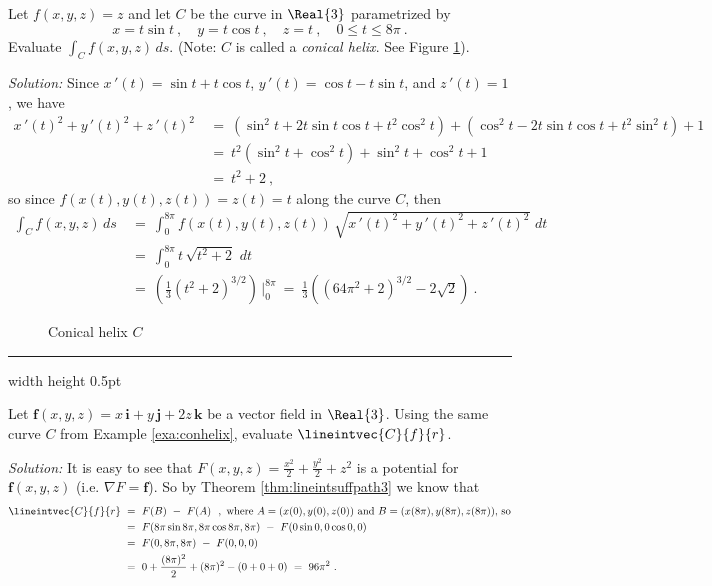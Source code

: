 \begin{exa}\label{exa:conhelix}
 Let $f(x,y,z) = z$ and let $C$ be the curve in $\Real{3}$ parametrized by
 \begin{displaymath}
  x=t\sin t ~,\quad y=t\cos t ~,\quad z=t ~,\quad 0\le t \le 8\pi ~.
 \end{displaymath}
 Evaluate $\int_C f(x,y,z)\,ds$. (Note:
 $C$ is called a \emph{conical helix}. See Figure \ref{fig:conhelix}).\vspace{1.5mm}
 \par\noindent \emph{Solution:} Since $x\,'(t)=\sin t + t\cos t$, $y\,'(t)=\cos t - t\sin t$, and $z\,'(t)=1$, we have
 \begin{align*}
  x\,'(t)^2 + y\,'(t)^2 + z\,'(t)^2 ~&=~ (\sin^2 t + 2t\sin t \cos t + t^2 \cos^2 t) + (\cos^2 t - 2t\sin t \cos t +
   t^2 \sin^2 t) + 1\\
   &=~ t^2 (\sin^2 t + \cos^2 t) + \sin^2 t + \cos^2 t + 1\\
   &=~ t^2 + 2 ~,
 \end{align*}
 so since $f(x(t),y(t),z(t)) = z(t) = t$ along the curve $C$, then
 \begin{align*}
  \int_C f(x,y,z)\,ds ~&=~ \int_0^{8\pi} f(x(t),y(t),z(t)) \,\sqrt{x\,'(t)^2 + y\,'(t)^2 + z\,'(t)^2}\,\,dt\\
   &=~ \int_0^{8\pi} t\,\sqrt{t^2 + 2}\,\,dt\\
   &=~ \left( \frac{1}{3} (t^2 + 2)^{3/2} \right) \,\Bigg|_0^{8\pi}
   ~=~ \frac{1}{3} \left( (64\pi^2 + 2)^{3/2} - 2\sqrt{2} \right) ~.
 \end{align*}\vspace{-24mm}
 \begin{figure}[h]
  \begin{center}
  \end{center}\vspace{-14mm}
  \caption[]{\quad Conical helix $C$}
  \label{fig:conhelix}
 \end{figure}
\end{exa}\vspace{-2mm}
\hrule width \textwidth height 0.5pt
\begin{exa}
 Let $\textbf{f}(x,y,z) = x\,\textbf{i} + y\,\textbf{j} + 2z\,\textbf{k}$ be a vector field in $\Real{3}$.
 Using the same curve $C$ from Example \ref{exa:conhelix}, evaluate $\lineintvec{C}{f}{r}$.\vspace{1.5mm}
 \par\noindent \emph{Solution:} It is easy to see that $F(x,y,z)=\frac{x^2}{2}+\frac{y^2}{2}+z^2$ is a potential for
 $\textbf{f}(x,y,z)$ (i.e. $\nabla F = \textbf{f}$). So by Theorem \ref{thm:lineintsuffpath3} we know that
 \begin{align*}
  \lineintvec{C}{f}{r} ~&=~ F(B) ~-~ F(A) ~~,~\text{where $A=(x(0),y(0),z(0))$ and $B=(x(8\pi),y(8\pi),z(8\pi))$, so}\\
   &=~ F(8\pi\sin 8\pi,8\pi\cos 8\pi,8\pi) ~-~ F(0\sin 0,0\cos 0,0)\\
   &=~ F(0,8\pi,8\pi) ~-~ F(0,0,0)\\
   &=~ 0+\frac{(8\pi)^2}{2} + (8\pi)^2 - (0+0+0)
   ~=~ 96\pi^2 ~.
 \end{align*}
\end{exa}
